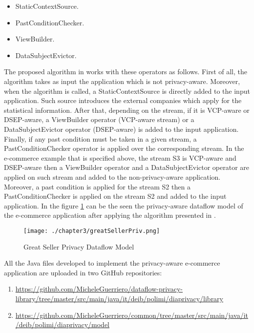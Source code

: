 \begin{itemize}
\item StaticContextSource.
\item PastConditionChecker.
\item ViewBuilder.
\item DataSubjectEvictor.
\end{itemize}

The proposed algorithm in \cite{privacypoliciesarticle} works with these operators as follows. First of all, the algorithm takes as input the application which is not privacy-aware. Moreover, when the algorithm is called, a StaticContextSource is directly added to the input application. Such source introduces the external companies which apply for the statistical information. After that, depending on the stream, if it is VCP-aware or DSEP-aware, a ViewBuilder operator (VCP-aware stream) or a DataSubjectEvictor operator (DSEP-aware) is added to the input application. Finally, if any past condition must be taken in a given stream, a PastConditionChecker operator is applied over the corresponding stream. In the e-commerce example that is specified above, the stream S3 is VCP-aware and DSEP-aware then a ViewBuilder operator and a DataSubjectEvictor operator are applied on such stream and added to the non-privacy-aware application. Moreover, a past condition is applied for the stream S2 then a PastConditionChecker is applied on the stream S2 and added to the input application. In the figure \ref{fig:Great Seller Privacy Dataflow Model} can be the seen the privacy-aware dataflow model of the e-commerce application after applying the algorithm presented in \cite{privacypoliciesarticle}.

\begin{figure}
\centering
{\texttt{[image: ./chapter3/greatSellerPriv.png]}}
\caption{Great Seller Privacy Dataflow Model}
\label{fig:Great Seller Privacy Dataflow Model}
\end{figure}

All the Java files developed to implement the privacy-aware e-commerce application are uploaded in two GitHub repositories:

\begin{enumerate}
\item \url{https://github.com/MicheleGuerriero/dataflow-privacy-library/tree/master/src/main/java/it/deib/polimi/diaprivacy/library}
\item \url{https://github.com/MicheleGuerriero/common/tree/master/src/main/java/it/deib/polimi/diaprivacy/model}
\end{enumerate}


